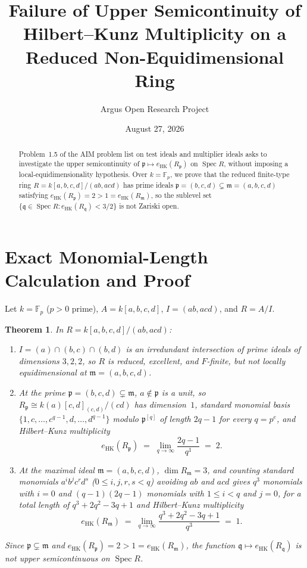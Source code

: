 \documentclass[10pt,reqno]{amsart}
\title[A Reduced Non-Equidimensional Counterexample to Hilbert--Kunz Upper Semicontinuity]
{Failure of Upper Semicontinuity of Hilbert--Kunz Multiplicity on a Reduced Non-Equidimensional Ring}
\author{Argus Open Research Project}
\date{August 27, 2026}
\newtheorem{theorem}{Theorem}[section]
\theoremstyle{definition}
\begin{document}
\begin{abstract}
Problem~1.5 of the AIM problem list on test ideals and multiplier ideals asks to investigate the upper semicontinuity of $\mathfrak{p}\mapsto e_{\mathrm{HK}}(R_{\mathfrak{p}})$ on $\operatorname{Spec} R$, without imposing a local-equidimensionality hypothesis. Over $k=\mathbb{F}_p$, we prove that the reduced finite-type ring $R=k[a,b,c,d]/(ab,acd)$ has prime ideals $\mathfrak{p}=(b,c,d)\subsetneq\mathfrak{m}=(a,b,c,d)$ satisfying $e_{\mathrm{HK}}(R_{\mathfrak{p}})=2 > 1 = e_{\mathrm{HK}}(R_{\mathfrak{m}})$, so the sublevel set $\{\mathfrak{q}\in\operatorname{Spec} R : e_{\mathrm{HK}}(R_{\mathfrak{q}})<3/2\}$ is not Zariski open.
\end{abstract}
\maketitle
\section{Exact Monomial-Length Calculation and Proof}
Let $k=\mathbb{F}_p$ ($p>0$ prime), $A=k[a,b,c,d]$, $I=(ab,acd)$, and $R=A/I$.
\begin{theorem}
In $R=k[a,b,c,d]/(ab,acd)$:
\begin{enumerate}[label=\textup{(\arabic*)}]
  \item $I = (a)\cap(b,c)\cap(b,d)$ is an irredundant intersection of prime ideals of dimensions $3,2,2$, so $R$ is reduced, excellent, and $F$-finite, but not locally equidimensional at $\mathfrak{m}=(a,b,c,d)$.
  \item At the prime $\mathfrak{p}=(b,c,d)\subsetneq\mathfrak{m}$, $a\notin\mathfrak{p}$ is a unit, so $R_{\mathfrak{p}}\cong k(a)[c,d]_{(c,d)}/(cd)$ has dimension~$1$, standard monomial basis $\{1,c,\dots,c^{q-1},d,\dots,d^{q-1}\}$ modulo $\mathfrak{p}^{[q]}$ of length $2q-1$ for every $q=p^e$, and Hilbert--Kunz multiplicity
  \[
    e_{\mathrm{HK}}(R_{\mathfrak{p}}) \;=\; \lim_{q\to\infty}\frac{2q-1}{q^1} \;=\; 2.
  \]
  \item At the maximal ideal $\mathfrak{m}=(a,b,c,d)$, $\dim R_{\mathfrak{m}}=3$, and counting standard monomials $a^i b^j c^r d^s$ ($0\le i,j,r,s<q$) avoiding $ab$ and $acd$ gives $q^3$ monomials with $i=0$ and $(q-1)(2q-1)$ monomials with $1\le i<q$ and $j=0$, for a total length of $q^3+2q^2-3q+1$ and Hilbert--Kunz multiplicity
  \[
    e_{\mathrm{HK}}(R_{\mathfrak{m}}) \;=\; \lim_{q\to\infty}\frac{q^3+2q^2-3q+1}{q^3} \;=\; 1.
  \]
\end{enumerate}
Since $\mathfrak{p}\subsetneq\mathfrak{m}$ and $e_{\mathrm{HK}}(R_{\mathfrak{p}})=2 > 1 = e_{\mathrm{HK}}(R_{\mathfrak{m}})$, the function $\mathfrak{q}\mapsto e_{\mathrm{HK}}(R_{\mathfrak{q}})$ is not upper semicontinuous on $\operatorname{Spec} R$.
\end{theorem}
\end{document}
